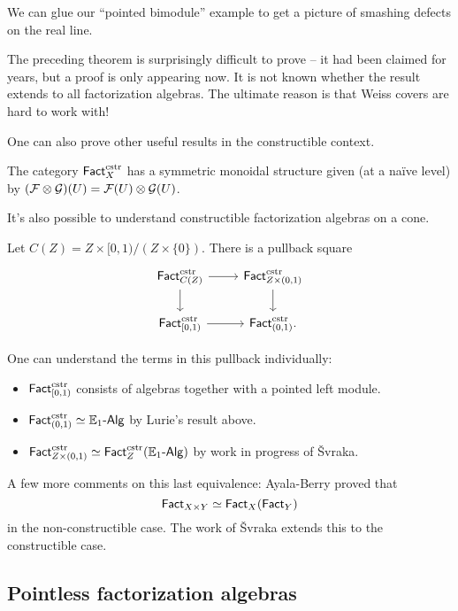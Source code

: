 \begin{ex}
	We can glue our ``pointed bimodule'' example to get a picture of smashing defects on the real line.
\end{ex}

The preceding theorem is surprisingly difficult to prove -- it had been claimed for years, but a proof is only appearing now.
It is not known whether the result extends to all factorization algebras.
The ultimate reason is that Weiss covers are hard to work with!

One can also prove other useful results in the constructible context.

\begin{thm}[KSW]
	The category $\mathsf{Fact}_X^{\mathrm{cstr}}$ has a symmetric monoidal structure given (at a na\"ive level) by $(\mathcal{F} \otimes \mathcal{G})(U) = \mathcal{F}(U) \otimes \mathcal{G}(U)$.
\end{thm}

It's also possible to understand constructible factorization algebras on a cone.

\begin{thm}
	Let $C(Z) = Z \times [0, 1) / (Z \times \{0\})$.
	There is a pullback square
	\[
		\begin{tikzcd}
			\Fact_{C(Z)}\cstr \rar \dar & \Fact_{Z \times (0,1)}\cstr \dar \\
			\Fact_{[0, 1)}\cstr \rar & \Fact_{(0,1)}\cstr.
		\end{tikzcd}
	\]
\end{thm}

One can understand the terms in this pullback individually:
\begin{itemize}
	\item $\mathsf{Fact}_{[0,1)}^{\mathrm{cstr}}$ consists of algebras together with a pointed left module.
	\item $\mathsf{Fact}_{(0,1)}^{\mathrm{cstr}} \simeq \mathbb{E}_1\textrm{-}\mathsf{Alg}$ by Lurie's result above.
	\item $\mathsf{Fact}_{Z \times (0,1)}^{\mathrm{cstr}} \simeq \mathsf{Fact}_Z^{\mathrm{cstr}}(\mathbb{E}_1\textrm{-}\mathsf{Alg})$ by work in progress of \v{S}vraka.
\end{itemize}
A few more comments on this last equivalence: Ayala-Berry proved that
\[
	\mathsf{Fact}_{X \times Y} \simeq \mathsf{Fact}_X(\mathsf{Fact}_Y)
\]
in the non-constructible case.
The work of \v{S}vraka extends this to the constructible case.

\subsection{Pointless factorization algebras}

